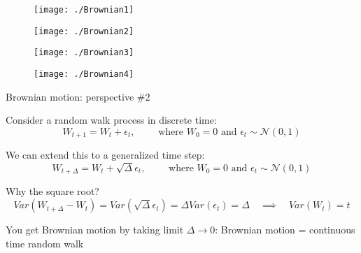 \documentclass[11pt, aspectratio=169]{beamer}
\newenvironment{witemize}{\itemize\addtolength{\itemsep}{10pt}}{\enditemize}
\begin{document}
\begin{frame}{}
	\begin{figure}
		\texttt{[image: ./Brownian1]}
	\end{figure}
\end{frame}


\begin{frame}{}
	\begin{figure}
		\texttt{[image: ./Brownian2]}
	\end{figure}
\end{frame}


\begin{frame}{}
	\begin{figure}
		\texttt{[image: ./Brownian3]}
	\end{figure}
\end{frame}


\begin{frame}{}
	\begin{figure}
		\texttt{[image: ./Brownian4]}
	\end{figure}
\end{frame}


\begin{frame}{Brownian motion: perspective \#2}
\begin{witemize}
\item Consider a random walk process in discrete time:
\begin{equation*}
	W_{t+1} = W_t + \epsilon_t, 
	\quad\quad \text{ where } 
	W_0 = 0 \text{ and } 
	\epsilon_t \sim \mathcal N(0, 1)
\end{equation*}

\item We can extend this to a generalized time step:
\begin{equation*}
	W_{t+\Delta} = W_t + \sqrt{\Delta} \epsilon_t, 
	\quad\quad \text{ where } 
	W_0 = 0 \text{ and } 
	\epsilon_t \sim \mathcal N(0, 1)
\end{equation*}

\item Why the square root? 
\begin{equation*}
	Var(W_{t + \Delta} - W_t) = Var(\sqrt{\Delta} \epsilon_t)
	= \Delta Var(\epsilon_t) = \Delta
	\quad \implies \quad
	Var(W_t) = t
\end{equation*}

\item You get Brownian motion by taking limit $\Delta \to 0$: Brownian motion = continuous time random walk
\end{witemize}
\end{frame}
\end{document}
